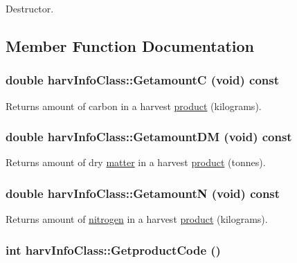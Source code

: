 Destructor. 

\subsection{Member Function Documentation}
\hypertarget{classharv_info_class_a3e988f8774326261f60383a487f2dca3}{
\subsubsection[{GetamountC}]{\setlength{\rightskip}{0pt plus 5cm}double harvInfoClass::GetamountC (void) const}}
\label{classharv_info_class_a3e988f8774326261f60383a487f2dca3}


Returns amount of carbon in a harvest \hyperlink{classproduct}{product} (kilograms). \hypertarget{classharv_info_class_a5858cef78437d316bd6fb8897a0940d8}{
\subsubsection[{GetamountDM}]{\setlength{\rightskip}{0pt plus 5cm}double harvInfoClass::GetamountDM (void) const}}
\label{classharv_info_class_a5858cef78437d316bd6fb8897a0940d8}


Returns amount of dry \hyperlink{classmatter}{matter} in a harvest \hyperlink{classproduct}{product} (tonnes). \hypertarget{classharv_info_class_abe831c13c5f1ef62a39db532478f3501}{
\subsubsection[{GetamountN}]{\setlength{\rightskip}{0pt plus 5cm}double harvInfoClass::GetamountN (void) const}}
\label{classharv_info_class_abe831c13c5f1ef62a39db532478f3501}


Returns amount of \hyperlink{classnitrogen}{nitrogen} in a harvest \hyperlink{classproduct}{product} (kilograms). \hypertarget{classharv_info_class_ae050b8dda387fb17e1f64dc7ffc254b1}{
\subsubsection[{GetproductCode}]{\setlength{\rightskip}{0pt plus 5cm}int harvInfoClass::GetproductCode ()}}
\label{classharv_info_class_ae050b8dda387fb17e1f64dc7ffc254b1}


